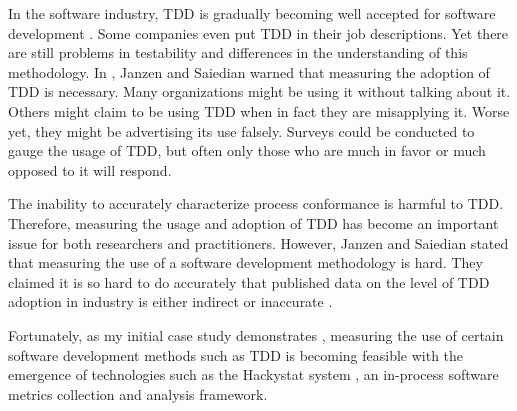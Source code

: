 In the software industry, TDD is gradually becoming well accepted for software development \cite{UnitTestingPoll:06}. Some companies even put TDD in their job descriptions. Yet there are still problems in testability and differences in the understanding of this methodology. In \cite{Janzen:05}, Janzen and Saiedian warned that measuring the adoption of TDD is necessary. Many organizations might be using it without talking about it. Others might claim to be using TDD when in fact they are misapplying it. Worse yet, they might be advertising its use falsely. Surveys could be conducted to gauge the usage of TDD, but often only those who are much in favor or much opposed to it will respond. 

The inability to accurately characterize process conformance is harmful to TDD. Therefore, measuring the usage and adoption of TDD has become an important issue for both researchers and practitioners. However, Janzen and Saiedian \cite{Janzen:05} stated that measuring the use of a software development methodology is hard. They claimed it is so hard to do accurately that published data on the level of TDD adoption in industry is either indirect or inaccurate \cite{Janzen:05,UnitTestingPoll:06}.

Fortunately, as my initial case study demonstrates \cite{csdl2-06-02}, measuring the use of certain software development methods such as TDD is becoming feasible with the emergence of technologies such as the Hackystat system \cite{Hackystat:06,csdl2-04-11,csdl2-04-22,csdl2-03-12}, an in-process software metrics collection and analysis framework.

\begin{comment}
In addition, there are many important research questions regarding software 
development using TDD. For example, When does it pay off to use TDD, and 
when does it not pay off to use TDD? One thing is clear: these questions cannot 
be answered accurately without good software
process measurement.   
\end{comment}

